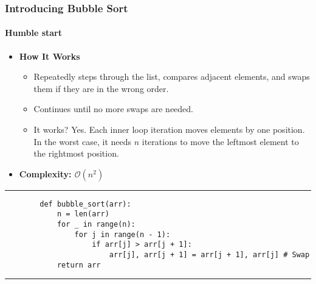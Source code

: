 \documentclass[compress,12pt,bookmark]{beamer}
\begin{document}
\begin{frame}[fragile]
    \frametitle{Introducing Bubble Sort}
    \framesubtitle{Humble start}

    \begin{itemize}
        \item \textbf{How It Works}
        \begin{itemize}
            \item Repeatedly steps through the list, compares adjacent elements, and swaps them if they are in the wrong order.
            \item Continues until no more swaps are needed.
            \item It works? Yes. Each inner loop iteration moves elements by one position. In the worst case, it needs \(n\) iterations to move the leftmost element to the rightmost position.
        \end{itemize}
        \item \textbf{Complexity: \(\mathcal{O}(n^2)\)}
    \end{itemize}

    \rule{\textwidth}{1pt}
    \scriptsize
    \begin{verbatim}
        def bubble_sort(arr):
            n = len(arr)
            for _ in range(n):
                for j in range(n - 1):
                    if arr[j] > arr[j + 1]:
                        arr[j], arr[j + 1] = arr[j + 1], arr[j] # Swap
            return arr
    \end{verbatim}
    \rule{\textwidth}{1pt}

\end{frame}
\end{document}
